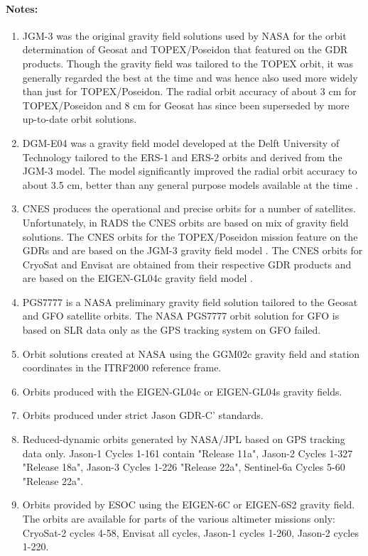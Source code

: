 \documentclass[a4paper,11pt,openany,natbib,nomargin]{thesis}
\newenvironment{notes}[1][Notes:]{\FloatBarrier\paragraph{#1}\begin{enumerate}}{\end{enumerate}}
\begin{document}
\begin{notes}
\item JGM-3 \citep{tapley1996} was the original gravity field solutions used by NASA for the orbit determination of Geosat and TOPEX/Poseidon that featured on the GDR products. Though the gravity field was tailored to the TOPEX orbit, it was generally regarded the best at the time and was hence also used more widely than just for TOPEX/Poseidon. The radial orbit accuracy of about 3 cm for TOPEX/Poseidon and 8 cm for Geosat has since been superseded by more up-to-date orbit solutions.\label{item:alt_jgm3}
\item DGM-E04 was a gravity field model developed at the Delft University of Technology tailored to the ERS-1 and ERS-2 orbits and derived from the JGM-3 model. The model significantly improved the radial orbit accuracy to about 3.5 cm, better than any general purpose models available at the time \citep{scharroo1998a}.\label{item:alt_dgme04}
\item CNES produces the operational and precise orbits for a number of satellites. Unfortunately, in RADS the CNES orbits are based on mix of gravity field solutions. The CNES orbits for the TOPEX/Poseidon mission feature on the GDRs and are based on the JGM-3 gravity field model \citep{tapley1996}. The CNES orbits for CryoSat and Envisat are obtained from their respective GDR products and are based on the EIGEN-GL04c gravity field model \citep{ablain2008}.\label{item:alt_cnes}
\item PGS7777 is a NASA preliminary gravity field solution tailored to the Geosat and GFO satellite orbits. The NASA PGS7777 orbit solution for GFO \citep{lemoine2006a} is based on SLR data only as the GPS tracking system on GFO failed.\label{item:alt_pgs7777}
\item Orbit solutions created at NASA using the GGM02c gravity field and station coordinates in the ITRF2000 reference frame.\label{item:alt_ggm02c}
\item Orbits produced with the EIGEN-GL04c or EIGEN-GL04s gravity fields.\label{item:alt_eiggl04s}
\item Orbits produced under strict Jason GDR-C' standards.\label{item:alt_gdrcp}
\item Reduced-dynamic orbits generated by NASA/JPL based on GPS tracking data only. Jason-1 Cycles 1-161 contain "Release 11a", Jason-2 Cycles 1-327 "Release 18a", Jason-3 Cycles 1-226 "Release 22a", Sentinel-6a Cycles 5-60 "Release 22a".\label{item:alt_gps}
\item Orbits provided by ESOC using the EIGEN-6C or EIGEN-6S2 gravity field. The orbits are available for parts of the various altimeter missions only: CryoSat-2 cycles 4-58, Envisat all cycles, Jason-1 cycles 1-260, Jason-2 cycles 1-220.\label{item:alt_eig6}

\end{notes}
\end{document}
